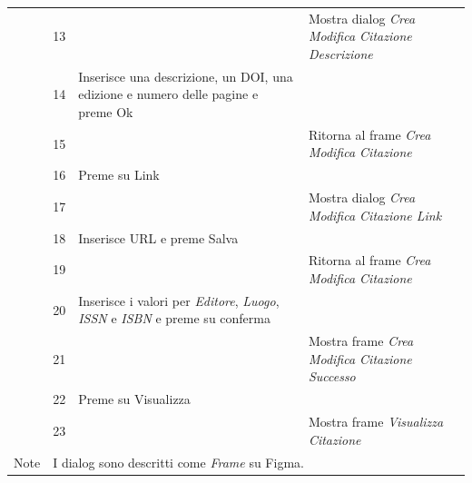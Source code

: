 \begin{table}[H]
\def\arraystretch{1.3}
\begin{tabularx}{\linewidth}{|l|p{5.5cm}@{}|X|X|}
\hline
  \cline{2-4} & 13 & & Mostra dialog \textit{Crea Modifica Citazione Descrizione}\\

  \cline{2-4} & 14 & Inserisce una descrizione, un DOI, una edizione e numero delle pagine e preme Ok& \\
  \cline{2-4} & 15 & & Ritorna al frame \textit{Crea Modifica Citazione} \\
  \cline{2-4} & 16 & Preme su Link & \\
  \cline{2-4} & 17 & & Mostra dialog \textit{Crea Modifica Citazione Link} \\
  \cline{2-4} & 18 & Inserisce URL e preme Salva & \\
  \cline{2-4} & 19 & & Ritorna al frame \textit{Crea Modifica Citazione} \\
  \cline{2-4} & 20 & Inserisce i valori per \textit{Editore}, \textit{Luogo}, \textit{ISSN} e \textit{ISBN} e preme su conferma & \\
  \cline{2-4} & 21 & & Mostra frame \textit{Crea Modifica Citazione Successo} \\
  \cline{2-4} & 22 & Preme su Visualizza & \\
  \cline{2-4} & 23 & & Mostra frame \textit{Visualizza Citazione} \\
   \hline Note & \multicolumn{3}{l|}{I dialog sono descritti come \textit{Frame} su Figma.} \\
   \hline

  \end{tabularx}
\end{table}
  
\newpage

